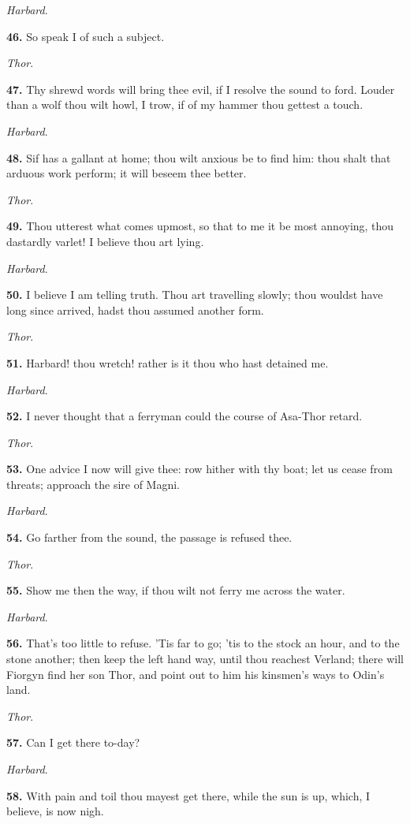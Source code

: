 \emph{Harbard}.

\textbf{46.} So speak I of such a subject.

\emph{Thor}.

\textbf{47.} Thy shrewd words will bring thee evil, if I resolve the sound to
ford. Louder than a wolf thou wilt howl, I trow, if of my hammer thou
gettest a touch.

\emph{Harbard}.

\textbf{48.} Sif has a gallant at home; thou wilt anxious be to find him:
thou shalt that arduous work perform; it will beseem thee better.

\emph{Thor}.

\textbf{49.} Thou utterest what comes upmost, so that to me it be most
annoying, thou dastardly varlet! I believe thou art lying.

\emph{Harbard}.

\textbf{50.} I believe I am telling truth. Thou art travelling slowly; thou
wouldst have long since arrived, hadst thou assumed another form.

\emph{Thor}.

\textbf{51.} Harbard! thou wretch! rather is it thou who hast detained me.

\emph{Harbard}.

\textbf{52.} I never thought that a ferryman could the course of Asa-Thor
retard.

\emph{Thor}.

\textbf{53.} One advice I now will give thee: row hither with thy boat; let
us cease from threats; approach the sire of Magni.

\emph{Harbard}.

\textbf{54.} Go farther from the sound, the passage is refused thee.

\emph{Thor}.

\textbf{55.} Show me then the way, if thou wilt not ferry me across the
water.

\emph{Harbard}.

\textbf{56.} That's too little to refuse. 'Tis far to go; 'tis to the stock
an hour, and to the stone another; then keep the left hand way, until
thou reachest Verland; there will Fiorgyn find her son Thor, and
point out to him his kinsmen's ways to Odin's land.

\emph{Thor}.

\textbf{57.} Can I get there to-day?

\emph{Harbard}.

\textbf{58.} With pain and toil thou mayest get there, while the sun is up,
which, I believe, is now nigh.


